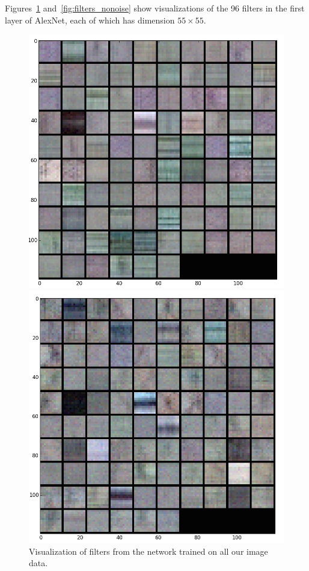 \documentclass[10pt]{article}
\begin{document}
Figures~\ref{fig:filters_all} and~\ref{fig:filters_nonoise} show visualizations of the 96 filters in
the first layer of AlexNet, each of which has dimension $55\times 55$.

\begin{figure}
\centering
  \begin{minipage}{.4\textwidth}
  \centering
  \includegraphics[width=1\linewidth]{Filters_All}
  \caption{Visualization of filters from the network trained on all our image data.}
  \label{fig:filters_all}
  \end{minipage}\hfill
  \begin{minipage}{.4\textwidth}
  \centering
  \includegraphics[width=1\linewidth]{Filters_NoNoise}

\end{minipage}
\end{figure}
\end{document}
